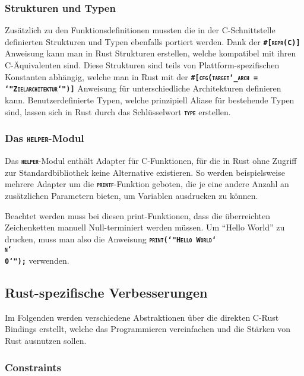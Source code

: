 \subsubsection{Strukturen und Typen}

Zusätzlich zu den Funktionsdefinitionen mussten die in der C-Schnittstelle definierten
Strukturen und Typen ebenfalls portiert werden.
Dank der \texttt{\textsc{\textbf{\#[repr(C)]}}} Anweisung kann man in Rust Strukturen erstellen,
welche kompatibel mit ihren C-Äquivalenten sind.
Diese Strukturen sind teils von Plattform-spezifischen Konstanten abhängig, welche man in Rust mit der
\texttt{\textsc{\textbf{\#[cfg(target\char`_arch = \char`"Zielarchitektur\char`")]}}} Anweisung
für unterschiedliche Architekturen definieren kann.
Benutzerdefinierte Typen, welche prinzipiell Aliase für bestehende Typen sind, lassen sich in Rust durch das
Schlüsselwort \texttt{\textsc{\textbf{type}}} erstellen.

\subsubsection{Das \texttt{\textsc{\textbf{helper}}}-Modul}

Das \texttt{\textsc{\textbf{helper}}}-Modul enthält Adapter für C-Funktionen,
für die in Rust ohne Zugriff zur Standardbibliothek keine Alternative existieren.
So werden beispielsweise mehrere Adapter um die \texttt{\textsc{\textbf{printf}}}-Funktion geboten,
die je eine andere Anzahl an zusätzlichen Parametern bieten, um Variablen ausdrucken zu können.

Beachtet werden muss bei diesen print-Funktionen, dass die überreichten Zeichenketten manuell
Null-terminiert werden müssen. Um "`Hello World"' zu drucken, muss man also die Anweisung
\texttt{\textsc{\textbf{print(\char`"Hello World\char`\\n\char`\\0\char`");}}} verwenden.

\subsection{Rust-spezifische Verbesserungen}

Im Folgenden werden verschiedene Abstraktionen über die direkten C-Rust Bindings erstellt, welche das Programmieren
vereinfachen und die Stärken von Rust ausnutzen sollen.

\subsubsection{Constraints}


